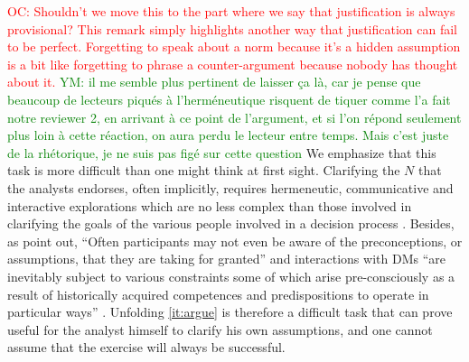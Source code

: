 \documentclass[preprint, french, english, 11pt, authoryear]{elsarticle}%
\newcommand{\acp}[1]{#1s}
\newcommand{\commentYM}[1]{\textcolor{green}{YM: #1}}
\newcommand{\commentOC}[1]{\textcolor{red}{OC: #1}}
\begin{document}
\begin{changebar}\commentOC{Shouldn’t we move this to the part where we say that justification is always provisional? This remark simply highlights another way that justification can fail to be perfect. 
Forgetting to speak about a norm because it’s a hidden assumption is a bit like forgetting to phrase a counter-argument because nobody has thought about it.} 
\commentYM{il me semble plus pertinent de laisser ça là, car je pense que beaucoup de lecteurs piqués à l'herméneutique risquent de tiquer comme l'a fait notre reviewer 2, en arrivant à ce point de l'argument, et si l'on répond seulement plus loin à cette réaction, on aura perdu le lecteur entre temps. Mais c'est juste de la rhétorique, je ne suis pas figé sur cette question}
We emphasize that this task is more difficult than one might think at first sight.
Clarifying the $N$ that the analysts endorses, often implicitly, requires hermeneutic, communicative and interactive explorations which are no less complex than those involved in clarifying the goals of the various people involved in a decision process \citep{reisach_creation_2016}.
Besides, as \citet{cronin_issues_2014} point out, ``Often participants may not even be aware of the preconceptions, or assumptions, that they are taking for granted'' and interactions with \acp{DM} 
``are inevitably subject to various constraints some of which arise pre-consciously as a result of historically acquired competences and predispositions to operate in particular ways'' \citep{brocklesby_ethics_2009}.
Unfolding \cref{it:argue} is therefore a difficult task that can prove useful for the analyst himself to clarify his own assumptions, and one cannot assume that the exercise will always be successful.\end{changebar}
\end{document}
